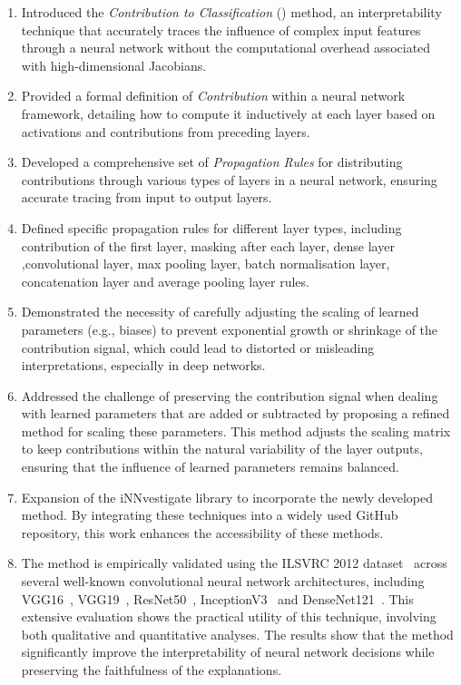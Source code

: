 \begin{enumerate}
  \item Introduced the \emph{Contribution to Classification} (\CTC\/) method, an interpretability technique that accurately traces the influence of complex input features through a neural network without the computational overhead associated with high-dimensional Jacobians.

  \item Provided a formal definition of \emph{Contribution} within a neural network framework, detailing how to compute it inductively at each layer based on activations and contributions from preceding layers.

  \item Developed a comprehensive set of \emph{Propagation Rules} for distributing contributions through various types of layers in a neural network, ensuring accurate tracing from input to output layers.

  \item Defined specific propagation rules for different layer types, including contribution of the first layer, masking after each layer, dense layer ,convolutional layer, max pooling layer, batch normalisation layer, concatenation layer and average pooling layer rules.

  \item Demonstrated the necessity of carefully adjusting the scaling of learned parameters (e.g., biases) to prevent exponential growth or shrinkage of the contribution signal, which could lead to distorted or misleading interpretations, especially in deep networks.

  \item Addressed the challenge of preserving the contribution signal when dealing with learned parameters that are added or subtracted by proposing a refined method for scaling these parameters. This method adjusts the scaling matrix to keep contributions within the natural variability of the layer outputs, ensuring that the influence of learned parameters remains balanced.
  \item Expansion of the iNNvestigate library to incorporate the newly developed \CTC\/ method. By integrating these techniques into a widely used GitHub repository, this work enhances the accessibility of these methods. 
  \item The \CTC\/ method is empirically validated using the ILSVRC 2012 dataset~\cite{ILSVRC15} across several well-known convolutional neural network architectures, including VGG16~\cite{SimonyanZ14a}, VGG19~\cite{SimonyanZ14a}, ResNet50~\cite{he2015deep}, InceptionV3~\cite{szegedy2015rethinking} and DenseNet121~\cite{huang2018densely}. This extensive evaluation shows the practical utility of this technique, involving both qualitative and quantitative analyses. The results show that the \CTC\/ method significantly improve the interpretability of neural network decisions while preserving the faithfulness of the explanations.
\end{enumerate}

